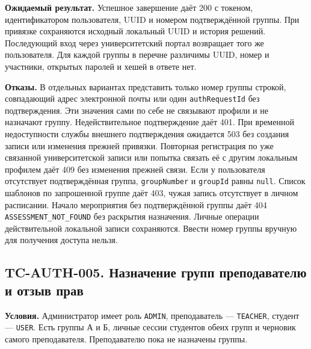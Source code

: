 \documentclass[12pt,a4paper]{article}
\begin{document}
\textbf{Ожидаемый результат.} Успешное завершение даёт 200 с токеном, идентификатором пользователя, UUID и номером подтверждённой группы. При привязке сохраняются исходный локальный UUID и история решений. Последующий вход через университетский портал возвращает того же пользователя. Для каждой группы в перечне различимы UUID, номер и участники, открытых паролей и хешей в ответе нет.

\textbf{Отказы.} В отдельных вариантах представить только номер группы строкой, совпадающий адрес электронной почты или один \texttt{auth\allowbreak{}Request\allowbreak{}Id} без подтверждения. Эти значения сами по себе не связывают профили и не назначают группу. Недействительное подтверждение даёт 401. При временной недоступности службы внешнего подтверждения ожидается 503 без создания записи или изменения прежней привязки. Повторная регистрация по уже связанной университетской записи или попытка связать её с другим локальным профилем даёт 409 без изменения прежней связи. Если у пользователя отсутствует подтверждённая группа, \texttt{group\allowbreak{}Number} и \texttt{groupId} равны \texttt{null}. Список шаблонов по запрошенной группе даёт 403, чужая запись отсутствует в личном расписании. Начало мероприятия без подтверждённой группы даёт 404 \texttt{ASSESSMENT\_\allowbreak{}NOT\_\allowbreak{}FOUND} без раскрытия назначения. Личные операции действительной локальной записи сохраняются. Ввести номер группы вручную для получения доступа нельзя.

\subsection{TC-AUTH-005. Назначение групп преподавателю и отзыв прав}\label{tc-auth-005-ux43dux430ux437ux43dux430ux447ux435ux43dux438ux435-ux433ux440ux443ux43fux43f-ux43fux440ux435ux43fux43eux434ux430ux432ux430ux442ux435ux43bux44e-ux438-ux43eux442ux437ux44bux432-ux43fux440ux430ux432}

\hypertarget{tc-auth-005-назначение-групп-преподавателю-и-отзыв-прав}{}

\hypertarget{tc-auth-005}{}

\textbf{Условия.} Администратор имеет роль \texttt{ADMIN}, преподаватель --- \texttt{TEACHER}, студент --- \texttt{USER}. Есть группы А и Б, личные сессии студентов обеих групп и черновик самого преподавателя. Преподавателю пока не назначены группы.
\end{document}
